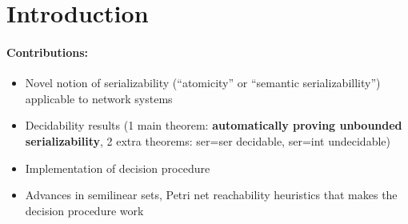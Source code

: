 \section{Introduction}
\label{sec:introduction}






\paragraph{Contributions:}
\begin{itemize}
    \item Novel notion of serializability (``atomicity'' or ``semantic serializabillity'') applicable to network systems
    \item Decidability results (1 main theorem: \textbf{automatically proving unbounded serializability}, 2 extra theorems: ser=ser decidable, ser=int undecidable)
    \item Implementation of decision procedure
    \item Advances in semilinear sets, Petri net reachability heuristics that makes the decision procedure work
\end{itemize}